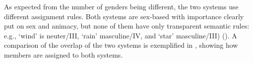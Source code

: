 \documentclass[output=collectionpaper]{langsci/langscibook}
\begin{document}
%


As expected from the number of genders being different, the two systems use different assignment rules. Both systems are sex-based with importance clearly put on sex and animacy, but none of them have only transparent semantic rules: e.g., `wind' is neuter/III, `rain' masculine/IV, and `star' masculine/III) (\citealt[103--107]{Donohue2001}). A comparison of the overlap of the two systems is exemplified in , showing how members are assigned to both systems.
\end{document}
